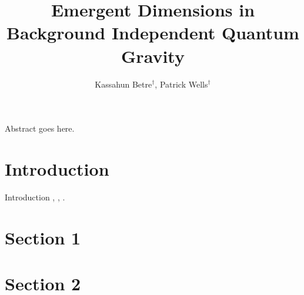 \documentclass[prd,12pt,nofootinbib]{revtex4}
\begin{document}
\begin{titlepage}
\title{Emergent Dimensions in Background Independent Quantum Gravity}
\author{Kassahun Betre$^{\dagger}$, Patrick Wells$^{\dagger}$}
\address{$^{\dagger}$Pepperdine University, 24255 Pacific Coast Hwy, Malibu, CA 90263, USA}

\maketitle

\begin{Abstract}
Abstract goes here.

\end{Abstract}

\end{titlepage}

\section{Introduction}
Introduction \cite{Konopka:2008hp}, \cite{Chen:2012ui}, \cite{Konopka:2008ds}.
\section{Section 1}
\section{Section 2}
\end{document}
